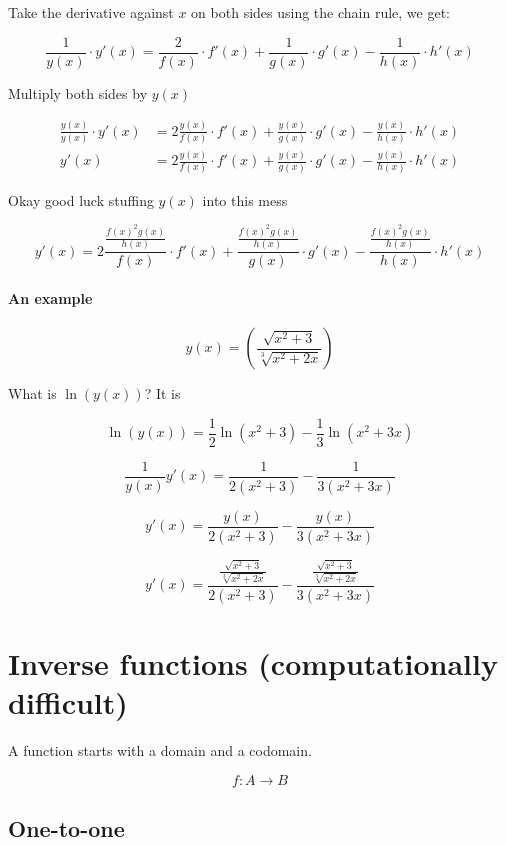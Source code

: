 \documentclass[12pt]{article}
\theoremstyle{plain}
\theoremstyle{remark}
\theoremstyle{definition}
\begin{document}
Take the derivative against \(x\) on both sides using the chain rule, we
get:

\[\frac{1}{y(x)} \cdot y'(x) = \frac{2}{f(x)} \cdot f'(x) + \frac{1}{g(x)} \cdot g'(x) - \frac{1}{h(x)} \cdot h'(x)\]

Multiply both sides by \(y(x)\)

\begin{align*}
\frac{y(x)}{y(x)} \cdot y'(x) &= 2\frac{y(x)}{f(x)} \cdot f'(x) + \frac{y(x)}{g(x)} \cdot g'(x) - \frac{y(x)}{h(x)} \cdot h'(x) \\
y'(x) &= 2\frac{y(x)}{f(x)} \cdot f'(x) + \frac{y(x)}{g(x)} \cdot g'(x) - \frac{y(x)}{h(x)} \cdot h'(x)
\end{align*}


Okay good luck stuffing \(y(x)\) into this mess

\[y'(x) = 2\frac{\frac{f(x)^{2}g(x)}{h(x)}}{f(x)} \cdot f'(x) + \frac{\frac{f(x)^{2}g(x)}{h(x)}}{g(x)} \cdot g'(x) - \frac{\frac{f(x)^{2}g(x)}{h(x)}}{h(x)} \cdot h'(x)\]


\paragraph{An example}

\[y(x) = \left( \frac{\sqrt{x^{2} + 3}}{\sqrt[3]{x^{2} + 2x}} \right)\]

What is \(\ln\left( y(x) \right)\)? It is

\[\ln\left( y(x) \right) = \frac{1}{2}\ln\left( x^{2} + 3 \right) - \frac{1}{3}\ln\left( x^{2} + 3x \right)\]

\[\frac{1}{y(x)}y'(x) = \frac{1}{2\left( x^{2} + 3 \right)} - \frac{1}{3\left( x^{2} + 3x \right)}\]

\[y'(x) = \frac{y(x)}{2\left( x^{2} + 3 \right)} - \frac{y(x)}{3\left( x^{2} + 3x \right)}\]

\[y'(x) = \frac{\frac{\sqrt{x^{2} + 3}}{\sqrt[3]{x^{2} + 2x}}}{2\left( x^{2} + 3 \right)} - \frac{\frac{\sqrt{x^{2} + 3}}{\sqrt[3]{x^{2} + 2x}}}{3\left( x^{2} + 3x \right)}\]


\section{Inverse functions (computationally
difficult)}

A function starts with a domain and a codomain.

\[f:A \rightarrow B\]


\subsection{One-to-one}
\end{document}
